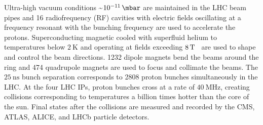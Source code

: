 Ultra-high vacuum conditions \sim$\SI{e-11}{\mbar}$ are maintained in the LHC beam pipes and 16 radiofrequency (RF) cavities with electric fields oscillating at a frequency resonant with the bunching frequency are used to accelerate the protons.
Superconducting magnetic cooled with superfluid helium to temperatures below $\SI{2}{\K}$ and operating at fields exceeding $\SI{8}{\T}$~\cite{LyndonEvans_2008} are used to shape and control the beam directions.
1232 dipole magnets bend the beams around the ring and 474 quadrupole magnets are used to focus and collimate the beams.
The $\SI{25}{\ns}$ bunch separation corresponds to 2808 proton bunches simultaneously in the LHC.
At the four LHC IPs, proton bunches cross at a rate of $\SI{40}{\MHz}$, creating collisions corresponding to temperatures a billion times hotter than the core of the sun.
Final states after the collisions are measured and recorded by the CMS, ATLAS, ALICE, and LHCb particle detectors.

